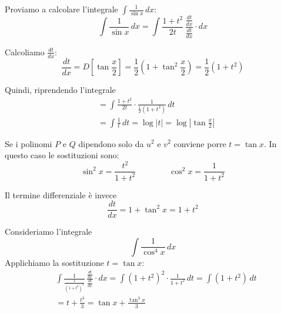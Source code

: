 \begin{example}
Proviamo a calcolare l'integrale $\int \frac{1}{\sin x} \, dx$:
\begin{equation*}
\int \frac{1}{\sin x} \, dx = \int \frac{1+t^2}{2t} \, \frac{\frac{dt}{dx}}{\frac{dt}{dx}} \cdot dx
\end{equation*}

Calcoliamo $\frac{dt}{dx}$:
\begin{equation*}
\frac{dt}{dx} = D\left[\tan\frac{x}{2}\right] = \frac{1}{2} \left(1 + \tan^2\frac{x}{2} \right) = \frac{1}{2} (1+t^2)
\end{equation*}

Quindi, riprendendo l'integrale
\begin{align*}
&= \int \frac{1+t^2}{2t} \cdot \frac{1}{\frac{1}{2}(1+t^2)} \, dt \\
&= \int \frac{1}{t} \, dt = \log |t| = \log \left\lvert\tan \frac{x}{2}\right\rvert 
\end{align*}
\end{example}

Se i polinomi $P$ e $Q$ dipendono solo da $u^2$ e $v^2$ conviene porre $t = \tan x$. In questo caso le sostituzioni sono:
\begin{equation*}
\sin^2 x = \frac{t^2}{1+t^2} \qquad \qquad \cos^2 x = \frac{1}{1+t^2}
\end{equation*}

Il termine differenziale è invece
\begin{equation*}
\frac{dt}{dx} = 1 + \tan^2 x = 1 + t^2
\end{equation*}

\begin{example}
Consideriamo l'integrale
\begin{equation*}
\int \frac{1}{\cos^4x} \, dx
\end{equation*}
Applichiamo la sostituzione $t=\tan x$:
\begin{align*}
&\int \frac{1}{\frac{1}{(1+t^2)^2}} \, \frac{\frac{dt}{dx}}{\frac{dt}{dx}} \cdot dx = \int (1+t^2)^2 \cdot \frac{1}{1+t^2} \, dt = \int (1+t^2) \, dt \\
&= t + \frac{t^3}{3} = \tan x + \frac{\tan^3 x}{3}
\end{align*}
\end{example}